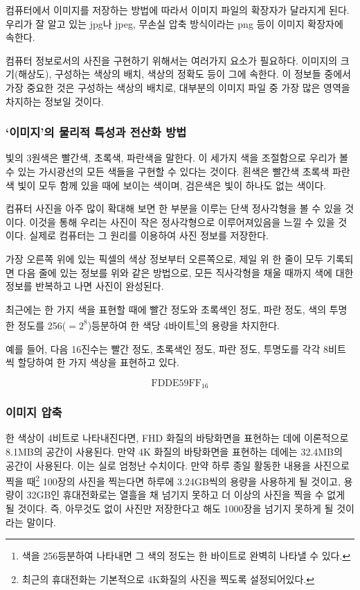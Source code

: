 \documentclass{article}
\begin{document}
컴퓨터에서 이미지를 저장하는 방법에 따라서 이미지 파일의 확장자가 달라지게 된다.
우리가 잘 알고 있는 jpg나 jpeg, 무손실 압축 방식이라는 png 등이 이미지 확장자에 속한다.

컴퓨터 정보로서의 사진을 구현하기 위해서는 여러가지 요소가 필요하다.
이미지의 크기(해상도), 구성하는 색상의 배치, 색상의 정확도 등이 그에 속한다.
이 정보들 중에서 가장 중요한 것은 구성하는 색상의 배치로,
대부분의 이미지 파일 중 가장 많은 영역을 차지하는 정보일 것이다.

\subsubsection{`이미지'의 물리적 특성과 전산화 방법}

빛의 3원색은 빨간색, 초록색, 파란색을 말한다. 이 세가지 색을 조절함으로 우리가 볼 수 있는
가시광선의 모든 색들을 구현할 수 있다는 것이다. 흰색은 빨간색 초록색 파란색 빛이 모두 함께 있을 때에
보이는 색이며, 검은색은 빛이 하나도 없는 색이다.

컴퓨터 사진을 아주 많이 확대해 보면 한 부분을 이루는 단색 정사각형을 볼 수 있을 것이다.
이것을 통해 우리는 사진이 작은 정사각형으로 이루어져있음을 느낄 수 있을 것이다.
실제로 컴퓨터는 그 원리를 이용하여 사진 정보를 저장한다.

가장 오른쪽 위에 있는 픽셀의 색상 정보부터 오른쪽으로,
제일 위 한 줄이 모두 기록되면 다음 줄에 있는 정보를 위와 같은 방법으로,
모든 직사각형을 채울 때까지 색에 대한 정보를 반복하고 나면 사진이 완성된다.

최근에는 한 가지 색을 표현할 때에 빨간 정도와 초록색인 정도, 파란 정도, 색의 투명한 정도를
256($=2^8$)등분하여 한 색당 4바이트\footnote{색을 256등분하여 나타내면 그 색의 정도는 한
바이트로 완벽히 나타낼 수 있다.}의 용량을 차지한다.

예를 들어, 다음 16진수는 빨간 정도, 초록색인 정도, 파란 정도, 투명도를 각각 8비트씩 할당하여
한 가지 색상을 표현하고 있다.

$$
\text{FDDE59FF}_{16}
$$

\subsubsection{이미지 압축}

한 색상이 4비트로 나타내진다면, FHD 화질의 바탕화면을 표현하는 데에 이론적으로 8.1MB의 공간이
사용된다. 만약 4K 화질의 바탕화면을 표현하는 데에는 32.4MB의 공간이 사용된다.
이는 실로 엄청난 수치이다. 만약 하루 종일 활동한 내용을 사진으로 찍을 때\footnote{최근의
휴대전화는 기본적으로 4K화질의 사진을 찍도록 설정되어있다.} 100장의 사진을 찍는다면
하루에 3.24GB씩의 용량을 사용하게 될 것이고, 용량이 32GB인 휴대전화로는 열흘을 채 넘기지 못하고
더 이상의 사진을 찍을 수 없게 될 것이다. 즉, 아무것도 없이 사진만 저장한다고 해도 1000장을
넘기지 못하게 될 것이라는 말이다.
\end{document}
